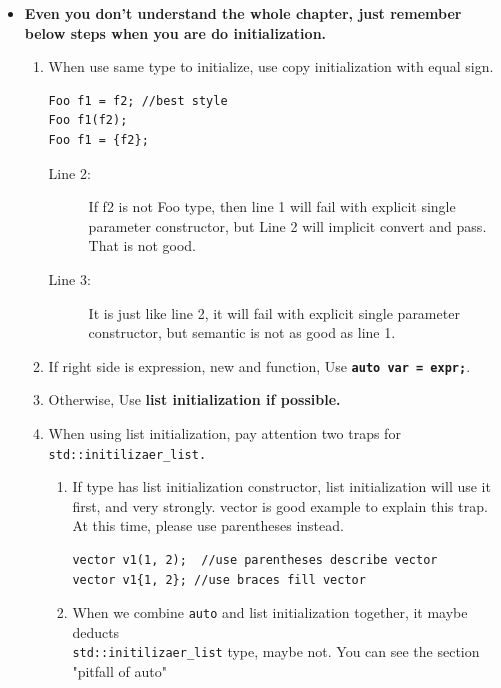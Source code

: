 \documentclass[a4paper,11pt,twoside]{book}
\begin{document}
\begin{itemize}
	\item \textbf{Even you don't understand the whole chapter, just remember below steps when you are do initialization.}
	\begin{enumerate}
		\item When use same type to initialize, use copy initialization with equal sign.
\begin{lstlisting}
Foo f1 = f2; //best style
Foo f1(f2);  
Foo f1 = {f2}; 
\end{lstlisting}
\begin{description}
	\item[Line 2:] If f2 is not Foo type, then line 1 will fail with explicit single parameter constructor, but Line 2 will implicit convert and pass. That is not good.
	
	\item[Line 3:] It is just like line 2, it will fail with explicit single parameter constructor, but semantic is not as good as line 1.
\end{description}
		\item If right side is expression, new and function, Use \textbf{\texttt{auto var = expr;}}. 
		
		\item Otherwise, Use \textbf{list initialization if possible.} 
		
		\item When using list initialization, pay attention two traps for \texttt{std::initilizaer\_list.} 
		\begin{enumerate}
			\item If type has list initialization constructor, list initialization will use it first, and very strongly. vector is good example to explain this trap. At this time, please use parentheses instead.
\begin{lstlisting}
vector v1(1, 2);  //use parentheses describe vector 
vector v1{1, 2}; //use braces fill vector
\end{lstlisting}
			
			\item When we combine \texttt{auto} and list initialization together, it maybe deducts \\ \texttt{std::initilizaer\_list} type, maybe not.  You can see the section "pitfall of auto" 
		\end{enumerate}
	\end{enumerate}
	
\end{itemize}
\end{document}

